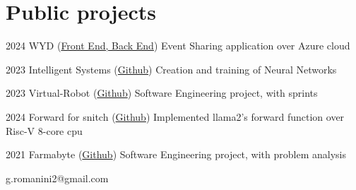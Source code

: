 \documentclass{tccv}
\begin{document}
\section{Public projects}

\begin{yearlist}
      \item{2024}
            {WYD (\href{https://github.com/RedDuality/WYD/tree/main/frontend/wyd_front}{Front End, } \href{https://github.com/RedDuality/WYD_back}{Back End})}
            {Event Sharing application over Azure cloud}
      \item{2023}
            {Intelligent Systems (\href{https://github.com/RedDuality/IntelligentSystems}{Github})}
            {Creation and training of Neural Networks}
      \item{2023}
            {Virtual-Robot (\href{https://github.com/RedDuality/issLab23}{Github})}
            {Software Engineering project, with sprints}
      \item{2024}
            {Forward for snitch (\href{https://github.com/RedDuality/snitch_forward}{Github})}
            {Implemented llama2's forward function over Risc-V 8-core cpu}
      \item{2021}
            {Farmabyte (\href{https://github.com/lorenzo9uerra/farmabyte-doc} {Github})}
            {Software Engineering project, with problem analysis}
            
\end{yearlist}


{g.romanini2@gmail.com}
{}
\end{document}
